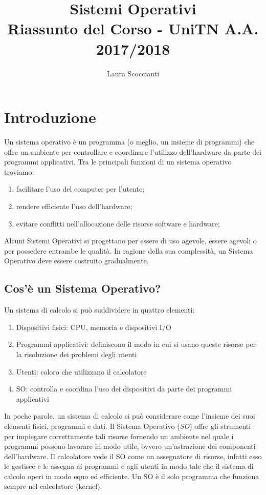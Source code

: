 \documentclass[a4paper]{article}
\title{
  Sistemi Operativi \\
  \large Riassunto del Corso - UniTN A.A. 2017/2018}
\author{Laura Scoccianti}
\begin{document}
\maketitle

\tableofcontents



\section{Introduzione}

Un sistema operativo è un programma (o meglio, un insieme di programmi) che offre un ambiente per controllare e coordinare l'utilizzo dell'hardware da parte dei programmi applicativi. Tra le principali funzioni di un sistema operativo troviamo:
\begin{enumerate}
    \item facilitare l'uso del computer per l'utente;
    \item rendere efficiente l'uso dell'hardware;
    \item evitare conflitti nell'allocazione delle risorse software e hardware;
\end{enumerate}
Alcuni Sistemi Operativi si progettano per essere di uso agevole, essere agevoli o per possedere entrambe le qualità. In ragione della sua complessità, un Sistema Operativo deve essere costruito gradualmente.

\subsection{Cos'è un Sistema Operativo?}

Un sistema di calcolo si può suddividere in quattro elementi:
\begin{enumerate}
    \item Dispositivi fisici: CPU, memoria e dispositivi I/O
    \item Programmi applicativi: definiscono il modo in cui si usano queste risorse per la risoluzione dei problemi degli utenti
    \item Utenti: coloro che utilizzano il calcolatore
    \item SO: controlla e coordina l’uso dei dispositivi da parte dei programmi applicativi
\end{enumerate}
In poche parole, un sistema di calcolo si può considerare come l’insieme dei suoi elementi fisici, programmi e dati. Il Sistema Operativo (\textit{SO}) offre gli strumenti per impiegare correttamente tali risorse fornendo un ambiente nel quale i programmi possono lavorare in modo utile, ovvero un'astrazione dei componenti dell'hardware. Il calcolatore vede il SO come un assegnatore di risorse, infatti esso le gestisce e le assegna ai programmi e agli utenti in modo tale che il sistema di calcolo operi in modo equo ed efficiente. Un SO è il solo programma che funziona sempre nel calcolatore (kernel).
\end{document}
